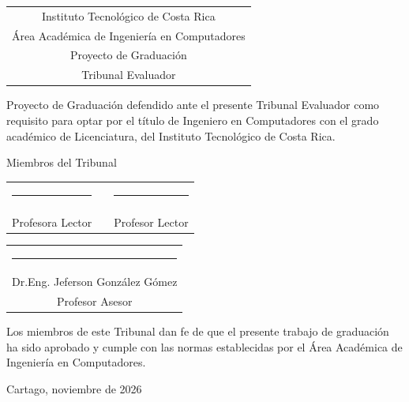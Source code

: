 \thispagestyle{empty}

\newcommand{\lectorI}{}
\newcommand{\lectorII}{}
\newcommand{\director}{Dr.Eng. Jeferson González Gómez}


\begin{center}
  \begin{tabular}{c}
    Instituto Tecnológico de Costa Rica \\
    Área Académica de Ingeniería en Computadores \\
    Proyecto de Graduación \\
    Tribunal Evaluador
  \end{tabular}
\end{center}

\vfill

Proyecto de Graduación defendido ante el presente Tribunal Evaluador como 
requisito para optar por el título de Ingeniero en Computadores con el grado 
académico de Licenciatura, del Instituto Tecnológico de Costa Rica.  

\vfill

\vspace*{20mm}
\begin{center}
 Miembros del Tribunal
\end{center}
\vspace*{8mm}

\vfill

\begin{center}
  \begin{tabular}{ccc}
    \rule{70mm}{0.5pt} & \rule{15mm}{0pt} & \rule{70mm}{0.5pt} \\
    \lectorI && \lectorII \\
    Profesora Lector && Profesor Lector
  \end{tabular}
  
  \vspace{10mm}

  \begin{tabular}{c}
    \rule{6cm}{0.5pt} \\
    \director \\
    Profesor Asesor
  \end{tabular}
\end{center}

\vfill


Los miembros de este Tribunal dan fe de que el presente trabajo de graduación
ha sido aprobado y cumple con las normas establecidas por el Área Académica de Ingeniería en Computadores.

\vfill

\begin{center}
  Cartago, noviembre de 2026\par
\end{center}


